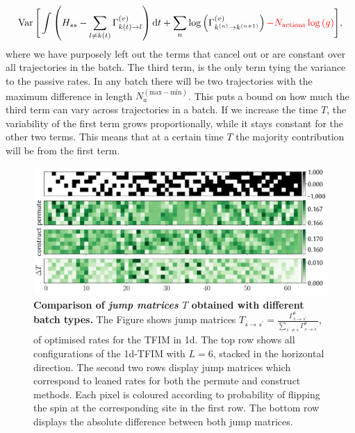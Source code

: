 \begin{equation}
\begin{aligned}
\operatorname{Var}\Bigg[\int\left(H_{s s}-\sum_{l \neq k(t)}\Gamma_{k(t) \rightarrow l}^{(v)}\right)\mathrm{d} t 
+ \sum_{n} \log \left(\Gamma_{k^{(n)} \rightarrow k^{(n+1)}}^{(v)}\right) \textcolor{red}{- N_{\text{actions}}\log{(g)}}\Bigg],
\end{aligned}
\end{equation}
where we have purposely left out the terms that cancel out or are constant over all trajectories in the batch. The third term, is the only term tying the variance to the passive rates. In any batch there will be two trajectories with the maximum difference in length $N_a^{(\text{max}-\text{min})}$. This puts a bound on how much the third term can vary across trajectories in a batch. If we increase the time $T$, the variability of the first term grows proportionally, while it stays constant for the other two terms. This means that at a certain time $T$ the majority contribution will be from the first term.
\begin{figure}[H]
	\centering
	\includegraphics[width=\linewidth]{Chapter5/Figs/Vector/rate_compare1}
	\caption[Comparison of \emph{jump matrices} $T$ obtained with different batch types]{\textbf{Comparison of \emph{jump matrices} $T$ obtained with different batch types.} The Figure shows jump matrices $T_{s \rightarrow s^{\prime}}=\frac{\Gamma_{s \rightarrow s^{\prime}}^{\theta}}{\sum_{s^{\prime} \neq s} \Gamma_{s \rightarrow s^{\prime}}^{\theta}}$, of optimised rates for the TFIM in 1d. The top row shows all configurations of the 1d-TFIM with $L=6$, stacked in the horizontal direction. The second two rows display jump matrices which correspond to leaned rates for both the permute and construct methods. Each pixel is coloured according to probability of flipping the spin at the corresponding site in the first row. The bottom row displays the absolute difference between both jump matrices.}
	\label{fig:ratecompare1}
\end{figure}
